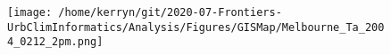 \documentclass{article}
\begin{document}



\begin{figure}
\centering    
\texttt{[image: /home/kerryn/git/2020-07-Frontiers-UrbClimInformatics/Analysis/Figures/GISMap/Melbourne\_Ta\_2004\_0212\_2pm.png]}
\end{figure} 
\clearpage
\end{document}
